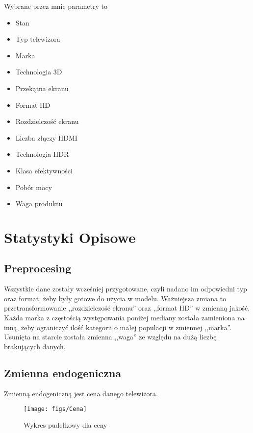 \documentclass[11pt,a4paper]{article}
\begin{document}
		Wybrane przez mnie parametry to 
		\begin{itemize}
			\item Stan
			\item Typ telewizora
			\item  Marka
			\item Technologia 3D
			\item  Przekątna ekranu
			\item 	Format HD
			\item 	 Rozdzielczość ekranu
			\item 	Liczba złączy HDMI
			\item 	Technologia HDR
			\item 	Klasa efektywności
			\item Pobór mocy
			\item 	Waga produktu
		\end{itemize}

		
	
\section{Statystyki Opisowe}	
	\subsection{Preprocesing}
		Wszystkie dane zostały wcześniej przygotowane, czyli nadano im odpowiedni typ oraz format, żeby były gotowe do użycia w modelu. Ważniejsza zmiana to przetransformowanie  ,,rozdzielczość ekranu'' oraz ,,format HD'' w zmienną jakość. Każda marka z częstością występowania poniżej mediany została zamieniona na inną, żeby ograniczyć ilość kategorii o małej populacji w zmiennej ,,marka''. Usunięta na starcie została zmienna ,,waga'' ze względu na dużą liczbę brakujących danych. 
		
	\subsection{Zmienna endogeniczna}
		Zmienną endogeniczną jest cena danego telewizora. 
		\begin{figure}[h]
			\centering
			\texttt{[image: figs/Cena]}
			\caption[Cena]{Wykres pudełkowy dla ceny}
			\label{fig:cena}
		\end{figure}
	
\end{document}
